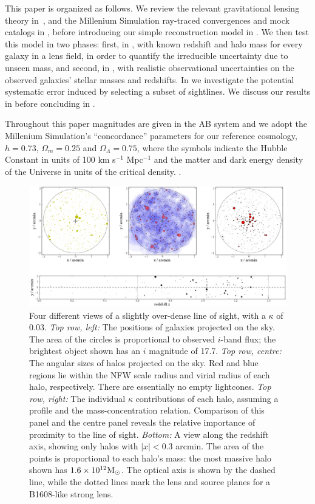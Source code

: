 \documentclass[useAMS,usenatbib]{mn2e}
\begin{document}
This paper is organized as follows. We review the relevant gravitational
lensing theory in~, and the Millenium Simulation
ray-traced convergences and mock catalogs in , before
introducing our simple reconstruction  model in . We
then test this model in two phases: first, in , with
known redshift and halo mass for every galaxy in a lens field, in order
to quantify the irreducible uncertainty due to unseen mass, and second,
in , with realistic observational uncertainties on
the observed galaxies' stellar masses and redshifts. In
 we investigate the potential systematic error induced
by selecting a subset of sightlines. We discuss our results in
 before concluding in .

Throughout this paper magnitudes are given in the AB system and
we adopt the Millenium Simulation's ``concordance'' parameters for our reference cosmology, \ie
$h=0.73$, $\Omega_m=0.25$ and $\Omega_\Lambda=0.75$, where the symbols indicate
the Hubble Constant in units of 100 km s$^{-1}$ Mpc$^{-1}$ and the matter and
dark energy density of the Universe in units of the critical density.
.%



\begin{figure}
\includegraphics[width=\textwidth]{figs/viewofalightcone.eps}
\caption[magcut]{Four different views of a slightly over-dense \MS line
of sight, with a $\kappa$ of 0.03. 
{\it Top row, left:} The positions of galaxies projected on the sky. The area
of the circles is proportional to observed $i$-band flux; the brightest
object shown has an $i$ magnitude of 17.7. 
{\it Top row, centre:} The angular sizes of halos projected on the sky.
Red and blue regions lie within the NFW scale radius and virial radius
of each halo, respectively. There are essentially no empty lightcones. 
{\it Top row, right:} The individual $\kappa$ contributions of
each halo, assuming a \citet{BMO} profile and the \citet{Neto2007}
mass-concentration relation. Comparison of
this panel and the centre panel reveals the relative importance of
proximity to the line of sight.
{\it Bottom:} A view along the redshift axis, showing only halos with
$|x|<0.3$ arcmin. The area of the points is proportional to each halo's
mass: the most massive halo shown has $1.6\times10^{12}\Msun$. The
optical axis is shown by the dashed line, while the dotted lines mark
the lens and source planes for a B1608-like strong lens.}
\label{fig:lightcone}
\end{figure}
\end{document}
